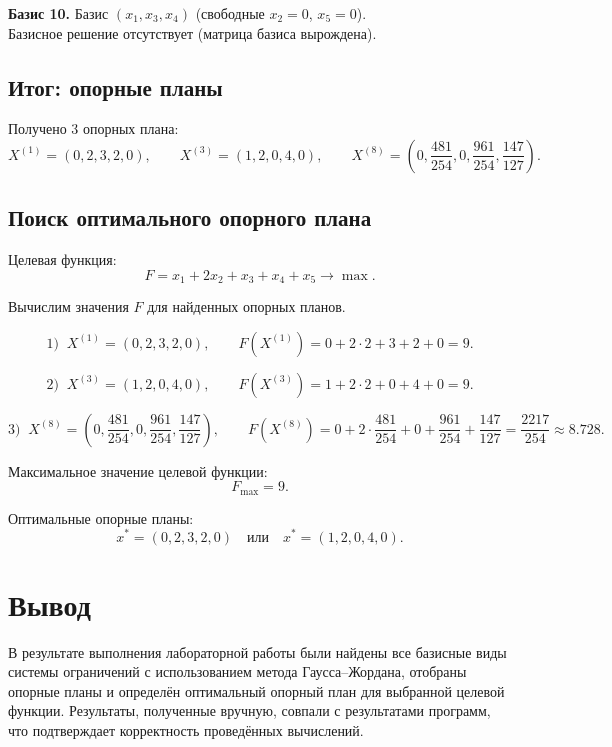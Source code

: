 \documentclass[a4paper,14pt]{extarticle}
\begin{document}
\textbf{Базис 10.} Базис \((x_1,x_3,x_4)\) (свободные \(x_2=0\), \(x_5=0\)). \\
Базисное решение отсутствует (матрица базиса вырождена).

\subsection*{Итог: опорные планы}

Получено 3 опорных плана:
\[
X^{(1)}=(0,2,3,2,0),
\qquad
X^{(3)}=(1,2,0,4,0),
\qquad
X^{(8)}=\left(0,\frac{481}{254},0,\frac{961}{254},\frac{147}{127}\right).
\]

\subsection*{Поиск оптимального опорного плана}

Целевая функция:
\[
F=x_1+2x_2+x_3+x_4+x_5\to\max.
\]

Вычислим значения \(F\) для найденных опорных планов.

\[
1)\;\; X^{(1)}=(0,2,3,2,0),\qquad
F(X^{(1)})=0+2\cdot2+3+2+0=9.
\]

\[
2)\;\; X^{(3)}=(1,2,0,4,0),\qquad
F(X^{(3)})=1+2\cdot2+0+4+0=9.
\]

\[
3)\;\; X^{(8)}=\left(0,\frac{481}{254},0,\frac{961}{254},\frac{147}{127}\right),\qquad
F(X^{(8)})=
0+2\cdot\frac{481}{254}+0+\frac{961}{254}+\frac{147}{127}
=\frac{2217}{254}\approx 8.728.
\]

Максимальное значение целевой функции:
\[
F_{\max}=9.
\]

Оптимальные опорные планы:
\[
x^*=(0,2,3,2,0)\quad \text{или}\quad x^*=(1,2,0,4,0).
\]

\section*{Вывод}
В результате выполнения лабораторной работы были найдены все базисные виды системы ограничений с использованием метода Гаусса–Жордана, отобраны опорные планы и определён оптимальный опорный план для выбранной целевой функции. Результаты, полученные вручную, совпали с результатами программ, что подтверждает корректность проведённых вычислений.
\end{document}
